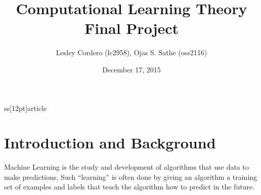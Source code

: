 ss[12pt]{article}
\usepackage[utf8]{inputenc}
 
 \usepackage{listings}
 \usepackage{color}
 \usepackage[margin=1.2in]{geometry}
 \usepackage{endnotes}
 \usepackage{multicol}
 \usepackage{enumitem}
 \usepackage{amsmath}
 \usepackage{amssymb}
 \usepackage{array}
  
   
																    
																	\lstset{style=mystyle}
																	\title{Computational Learning Theory Final Project}
																	\author{Lesley Cordero (lc2958), Ojas S. Sathe (oss2116) }
																	\date{December 17, 2015}

																	

																	\maketitle

																	\section{Introduction and Background}
																	    
																		    Machine Learning is the study and development of algorithms that use data to make predictions. Such “learning” is often done by giving an algorithm a training set of examples and labels that teach the algorithm how to predict in the future. \vspace{4mm}
																			    
